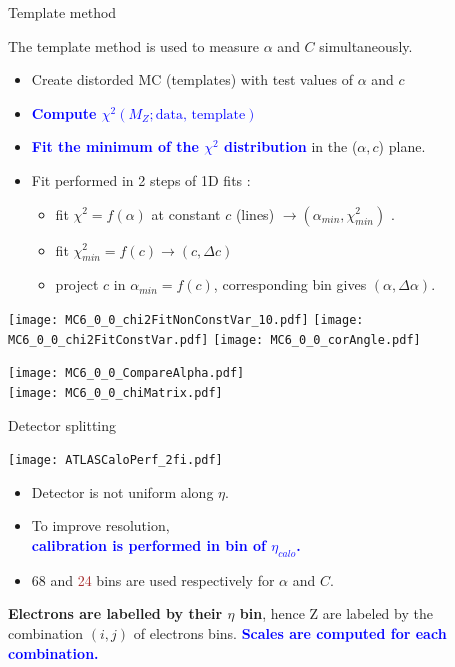\begin{frame}{Template method}
\begin{minipage}{0.59\linewidth}
  The template method is used to measure $\alpha$ and $C$ simultaneously.
\begin{itemize}
\item Create distorded MC (templates) with test values of $\alpha$ and $c$
\item \textcolor{blue}{\bf Compute $\chi^2( M_Z; \text{data, template})$}
\item \textcolor{blue}{\bf Fit the minimum of the $\chi^2$ distribution} in the ($\alpha,c$) plane.
\item Fit performed in 2 steps of 1D fits : 
\begin{itemize}
\item fit $\chi^2=f(\alpha)$ at constant $c$ (lines) $\rightarrow (\alpha_{min}, \chi^2_{min})$ .
\item fit $\chi^2_{min}=f(c)\rightarrow (c, \Delta c)$
\item project $c$ in $\alpha_{min}=f(c)$, corresponding bin gives $(\alpha, \Delta\alpha)$.
\end{itemize}
\end{itemize}
  \texttt{[image: MC6\_0\_0\_chi2FitNonConstVar\_10.pdf]}
  \texttt{[image: MC6\_0\_0\_chi2FitConstVar.pdf]}
  \texttt{[image: MC6\_0\_0\_corAngle.pdf]}
\end{minipage}
\hfill
\begin{minipage}{0.4\linewidth}
  \texttt{[image: MC6\_0\_0\_CompareAlpha.pdf]}\\
  \texttt{[image: MC6\_0\_0\_chiMatrix.pdf]}\\
\end{minipage}
\end{frame}

\begin{frame}{Detector splitting}
  \begin{minipage}{0.49\linewidth}
    \texttt{[image: ATLASCaloPerf\_2fi.pdf]}
  \end{minipage}
  \begin{minipage}{0.49\linewidth}
    \begin{itemize}
    \item Detector is not uniform along $\eta$.
    \item To improve resolution, \\ \textcolor{blue}{\bf calibration is performed in bin of $\eta_{calo}$.}
    \item 68 and \textcolor{brown}{24} bins are used respectively for $\alpha$ and $C$.\\
    \end{itemize}
  \end{minipage}
  \vfill
  {\bf Electrons are labelled by their $\eta$ bin}, hence Z are labeled by the combination $(i, j)$ of electrons bins.
  \textcolor{blue}{\bf Scales are computed for each combination.}
\end{frame}

